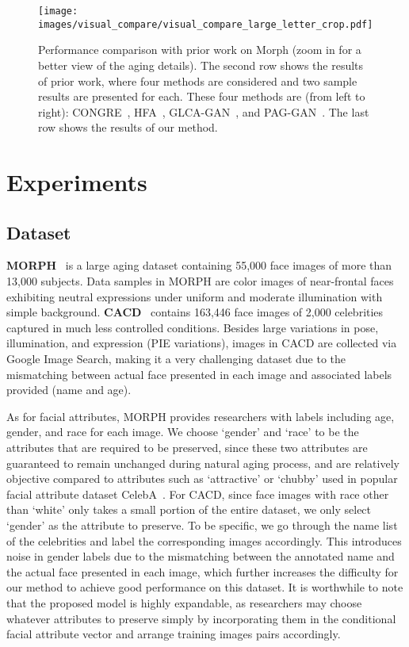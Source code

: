 \documentclass[10pt,twocolumn,letterpaper]{article}
\begin{document}
\begin{figure*}[ht]
\centering\texttt{[image: images/visual\_compare/visual\_compare\_large\_letter\_crop.pdf]}
\caption{Performance comparison with prior work on Morph (zoom in for a better view of the aging details). The second row shows the results of prior work, where four methods are considered and two sample results are presented for each. These four methods are (from left to right): CONGRE~\cite{suo2012concatenational}, HFA~\cite{yang2016face}, GLCA-GAN~\cite{li2018global}, and PAG-GAN~\cite{yang2017learning}. The last row shows the results of our method.}
\label{fig:compareResults}
\end{figure*}

\section{Experiments}

\subsection{Dataset}
\textbf{MORPH}~\cite{ricanek2006morph} is a large aging dataset containing 55,000 face images of more than 13,000 subjects. 
Data samples in MORPH are color images of near-frontal faces exhibiting neutral expressions under uniform and moderate illumination with simple background. 
\textbf{CACD}~\cite{chen2015face} contains 163,446 face images of 2,000 celebrities captured in much less controlled conditions. Besides large variations in pose, illumination, and expression (PIE variations), images in CACD are collected via Google Image Search, making it a very challenging dataset due to the mismatching between actual face presented in each image and associated labels provided (name and age).

As for facial attributes, MORPH provides researchers with labels including age, gender, and race for each image. We choose `gender' and `race' to be the attributes that are required to be preserved, since these two attributes are guaranteed to remain unchanged during natural aging process, and are relatively objective compared to attributes such as `attractive' or `chubby' used in popular facial attribute dataset CelebA~\cite{liu2015faceattributes}.
For CACD, since face images with race other than `white' only takes a small portion of the entire dataset, we only select `gender' as the attribute to preserve. 
To be specific, we go through the name list of the celebrities and label the corresponding images accordingly. This introduces noise in gender labels due to the mismatching between the annotated name and the actual face presented in each image, which further increases the difficulty for our method to achieve good performance on this dataset.
It is worthwhile to note that the proposed model is highly expandable, as researchers may choose whatever attributes to preserve simply by incorporating them in the conditional facial attribute vector and arrange training images pairs accordingly.
\end{document}
